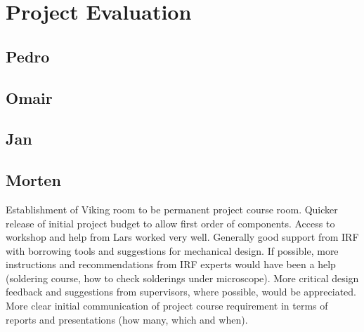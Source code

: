 \newpage
\chapter{Project Evaluation}
\label{chap:evaluation}


\section{Pedro}


\section{Omair}


\section{Jan}


\section{Morten}
Establishment of Viking room to be permanent project course room. 
Quicker release of initial project budget to allow first order of components. 
Access to workshop and help from Lars worked very well.
Generally good support from IRF with borrowing tools and suggestions for mechanical design. If possible, more instructions and recommendations from IRF experts would have been a help (soldering course, how to check solderings under microscope).
More critical design feedback and suggestions from supervisors, where possible, would be appreciated.
More clear initial communication of project course requirement in terms of reports and presentations (how many, which and when).